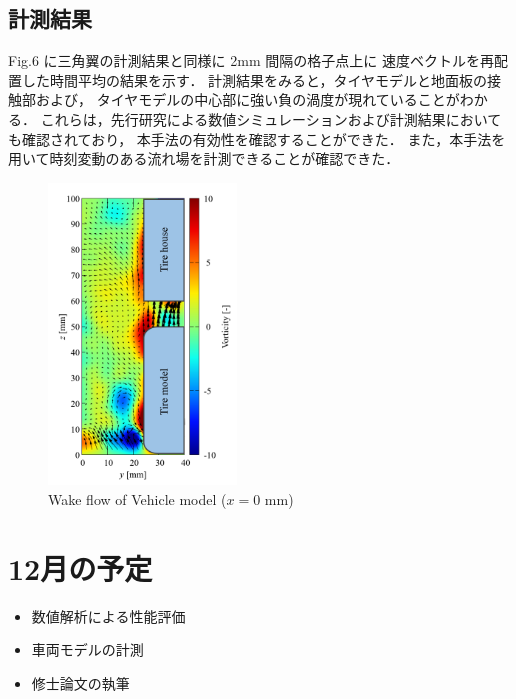 \documentclass[twocolumn,a4j]{jsarticle}
\begin{document}
\newpage
\subsection{計測結果}
Fig.6 に三角翼の計測結果と同様に 2mm 間隔の格子点上に
速度ベクトルを再配置した時間平均の結果を示す．
計測結果をみると，タイヤモデルと地面板の接触部および，
タイヤモデルの中心部に強い負の渦度が現れていることがわかる．
これらは，先行研究による数値シミュレーションおよび計測結果においても確認されており，
本手法の有効性を確認することができた．
また，本手法を用いて時刻変動のある流れ場を計測できることが確認できた．

\begin{figure}[htbp]
  \centering
  \includegraphics[keepaspectratio, width=50mm]{../images/VehicleModel_Vorticity_x=0.png}
  \caption{Wake flow of Vehicle model ($x=0$ mm)}
\end{figure}

\section{12月の予定}
\begin{itemize}
  \item 数値解析による性能評価
  \item 車両モデルの計測
  \item 修士論文の執筆
\end{itemize}
\end{document}
